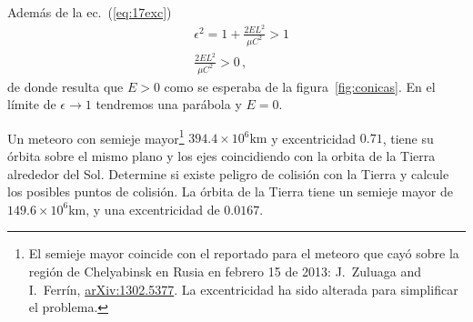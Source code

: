 Además de la ec.~(\ref{eq:17exc})
\begin{align}
  &\epsilon^2=1+\frac{2EL^2}{\mu C^2}>  1\nonumber\\
 &\frac{2EL^2}{\mu C^2}>0\,,
\end{align}
de donde resulta que $E>0$ como se esperaba de la figura~\ref{fig:conicas}. En el límite de $\epsilon\to 1$ tendremos una parábola y $E=0$.

\ejemplo{}
\begin{frame}
Un meteoro con semieje mayor\footnote{El semieje mayor coincide con el reportado para el meteoro que cayó sobre la región de Chelyabinsk en Rusia en febrero 15 de 2013: J.~Zuluaga and I.~Ferrín, \href{http://arxiv.org/abs/1302.5377}{arXiv:1302.5377}. La excentricidad ha sido alterada para simplificar el problema.} ${394.4\times10^{6}}\si{\kilo\meter}$ y  excentricidad $0.71$, tiene su órbita sobre el mismo plano y los ejes coincidiendo con la orbita de la Tierra alrededor del Sol. Determine si existe peligro de colisión con la Tierra y calcule  los posibles puntos de colisión. La órbita de la Tierra tiene un semieje mayor de ${149.6\times10^{6}}\si{\kilo\meter}$,  y una excentricidad de $0.0167$.
\end{frame}

